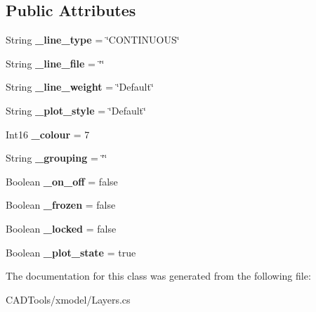 \subsection*{Public Attributes}
\begin{DoxyCompactItemize}
\item 
\mbox{\label{class_c_a_d_tools_1_1_layer_a9501500841982690d5cca670e9e09594}} 
String {\bfseries \+\_\+line\+\_\+type} = \char`\"{}C\+O\+N\+T\+I\+N\+U\+O\+US\char`\"{}
\item 
\mbox{\label{class_c_a_d_tools_1_1_layer_a40dec8af3759cde53eae32ae947c3a83}} 
String {\bfseries \+\_\+line\+\_\+file} = \char`\"{}\char`\"{}
\item 
\mbox{\label{class_c_a_d_tools_1_1_layer_a11c9e415ae461fb401abea136bddf6df}} 
String {\bfseries \+\_\+line\+\_\+weight} = \char`\"{}Default\char`\"{}
\item 
\mbox{\label{class_c_a_d_tools_1_1_layer_af12ed1aad7fa4db3116739a8d2c1337a}} 
String {\bfseries \+\_\+plot\+\_\+style} = \char`\"{}Default\char`\"{}
\item 
\mbox{\label{class_c_a_d_tools_1_1_layer_abe22f5446ed75bab1a2568ac8159267f}} 
Int16 {\bfseries \+\_\+colour} = 7
\item 
\mbox{\label{class_c_a_d_tools_1_1_layer_a8720e41b123177f9da5f6f9f31f60591}} 
String {\bfseries \+\_\+grouping} = \char`\"{}\char`\"{}
\item 
\mbox{\label{class_c_a_d_tools_1_1_layer_a55f4f36b306fa5cd2b855ce230c2694e}} 
Boolean {\bfseries \+\_\+on\+\_\+off} = false
\item 
\mbox{\label{class_c_a_d_tools_1_1_layer_afc6631aa91fe8f221330257967a08ab0}} 
Boolean {\bfseries \+\_\+frozen} = false
\item 
\mbox{\label{class_c_a_d_tools_1_1_layer_a5277f018414cf8332cd830b311b57f87}} 
Boolean {\bfseries \+\_\+locked} = false
\item 
\mbox{\label{class_c_a_d_tools_1_1_layer_ae8133e9e7b29b6e35ff6c74c7137cd27}} 
Boolean {\bfseries \+\_\+plot\+\_\+state} = true
\end{DoxyCompactItemize}


The documentation for this class was generated from the following file\+:\begin{DoxyCompactItemize}
\item 
C\+A\+D\+Tools/xmodel/Layers.\+cs\end{DoxyCompactItemize}
